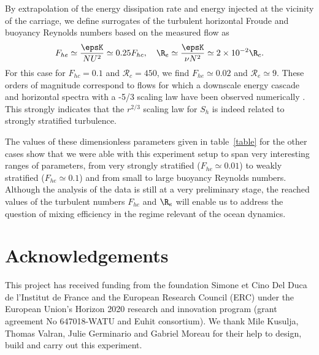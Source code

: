 \noindent By extrapolation of the energy dissipation rate and energy injected
at the vicinity of the carriage, we define surrogates of the turbulent
horizontal Froude and buoyancy Reynolds numbers based on the measured flow as
\begin{equation}
F_{he} \simeq \frac{\epsK}{N U^2} \simeq 0.25 F_{hc},\quad 
\R_e \simeq \frac{\epsK}{\nu N^2} \simeq 2\times10^{-2} \R_c.
\label{eq:e}
\end{equation}
For this case for $F_{hc} = 0.1$ and $\mathcal{R}_c=450$, we find
$F_{he} \simeq 0.02$ and $\mathcal{R}_e \simeq 9$. These orders of magnitude
correspond to flows for which a downscale energy cascade and horizontal spectra
with a -5/3 scaling law have been observed numerically
\cite[]{BrethouwerBillantLindborg2007, AugierBillantChomaz2015}.
%
This strongly indicates that the $r^{2/3}$ scaling law for $S_h$ is indeed
related to strongly stratified turbulence.

\noindent The values of these dimensionless parameters given in table~\ref{table} for the
other cases show that we were able with this experiment setup to span very
interesting ranges of parameters, from very strongly stratified
($F_{he} \simeq 0.01$) to weakly stratified ($F_{he} \simeq 0.1$) and from
small to large buoyancy Reynolds numbers.
%
Although the analysis of the data is still at a very preliminary stage, the
reached values of the turbulent numbers $F_{he}$ and $\R_e$ will enable us to
address the question of mixing efficiency in the regime relevant of the ocean
dynamics.

\section*{Acknowledgements}

This project has received funding from the foundation Simone et Cino Del Duca de
l'Institut de France and the European Research Council (ERC) under the European
Union's Horizon 2020 research and innovation program (grant agreement No
647018-WATU and Euhit consortium).
%
We thank Mile Kusulja, Thomas Valran, Julie Germinario and Gabriel Moreau for
their help to design, build and carry out this experiment.


% 
% 
%
%
% 

